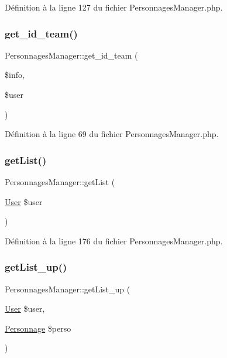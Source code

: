 Définition à la ligne 127 du fichier Personnages\+Manager.\+php.

\mbox{\label{class_personnages_manager_a31cfc4ec0c66e7c885aabd6cd021bc39}} 
\subsubsection{\texorpdfstring{get\+\_\+id\+\_\+team()}{get\_id\_team()}}
{\footnotesize\ttfamily Personnages\+Manager\+::get\+\_\+id\+\_\+team (\begin{DoxyParamCaption}\item[{}]{\$info,  }\item[{}]{\$user }\end{DoxyParamCaption})}



Définition à la ligne 69 du fichier Personnages\+Manager.\+php.

\mbox{\label{class_personnages_manager_add99175d706a1b0909c8c8857561ea41}} 
\subsubsection{\texorpdfstring{get\+List()}{getList()}}
{\footnotesize\ttfamily Personnages\+Manager\+::get\+List (\begin{DoxyParamCaption}\item[{\mbox{\hyperlink{class_user}{User}}}]{\$user }\end{DoxyParamCaption})}



Définition à la ligne 176 du fichier Personnages\+Manager.\+php.

\mbox{\label{class_personnages_manager_a3453160024d09fb70cb0a16e4de14ffe}} 
\subsubsection{\texorpdfstring{get\+List\+\_\+up()}{getList\_up()}}
{\footnotesize\ttfamily Personnages\+Manager\+::get\+List\+\_\+up (\begin{DoxyParamCaption}\item[{\mbox{\hyperlink{class_user}{User}}}]{\$user,  }\item[{\mbox{\hyperlink{class_personnage}{Personnage}}}]{\$perso }\end{DoxyParamCaption})}



